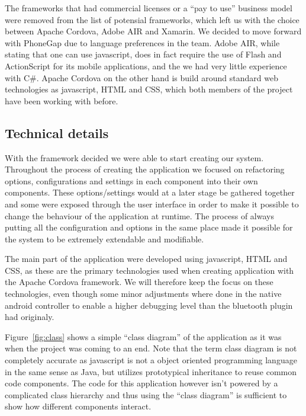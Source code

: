 	\bigskip\noindent
	The frameworks that had commercial licenses or a "`pay to use"' business model were removed from the list of potensial frameworks, which left us with the choice between Apache Cordova, Adobe AIR and Xamarin.
	We decided to move forward with PhoneGap due to language preferences in the team. Adobe AIR, while stating that one can use javascript, does in fact require the use of Flash and ActionScript for its mobile applications, and the we had very little experience with C\#.
	Apache Cordova on the other hand is build around standard web technologies as javascript, HTML and CSS, which both members of the project have been working with before.
	
\subsection*{Technical details}
With the framework decided we were able to start creating our system. 
Throughout the process of creating the application we focused on refactoring options, configurations and settings in each component into their own components. These options/settings would at a later stage be gathered together and some were exposed through the user interface in order to make it possible to change the behaviour of the application at runtime. The process of always putting all the configuration and options in the same place made it possible for the system to be extremely extendable and modifiable. 

\bigskip\noindent
The main part of the application were developed using javascript, HTML and CSS, as these are the primary technologies used when creating application with the Apache Cordova framework. We will therefore keep the focus on these technologies, even though some minor adjustments where done in the native android controller to enable a higher debugging level than the bluetooth plugin had originaly.

\bigskip\noindent
Figure~\ref{fig:class} shows a simple "`class diagram"' of the application as it was when the project was coming to an end. Note that the term class diagram is not completely accurate as javascript is not a object oriented programming language in the same sense as Java, but utilizes prototypical inheritance to reuse common code components. The code for this application however isn't powered by a complicated class hierarchy and thus using the "`class diagram"' is sufficient to show how different components interact.


